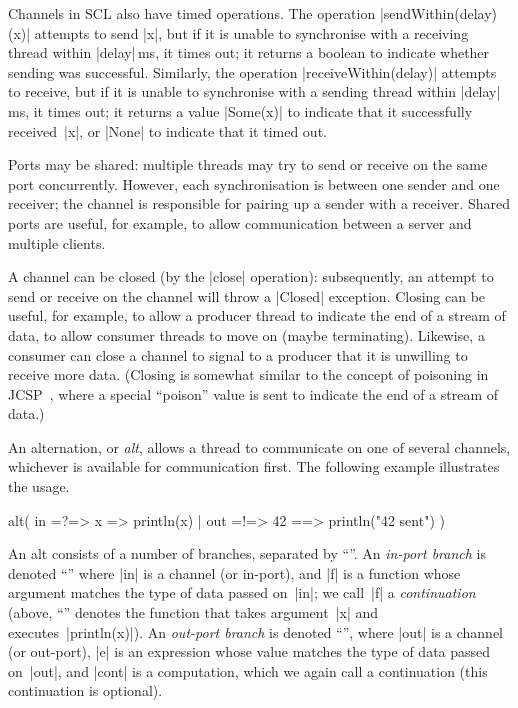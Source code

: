 Channels in SCL also have timed operations.  The operation
|sendWithin(delay)(x)| attempts to send |x|, but if it is unable to
synchronise with a receiving thread within |delay|\,ms, it times out; it
returns a boolean to indicate whether sending was successful.  Similarly, the
operation |receiveWithin(delay)| attempts to receive, but if it is unable to
synchronise with a sending thread within |delay|\,ms, it times out; it returns
a value |Some(x)| to indicate that it successfully received~|x|, or |None| to
indicate that it timed out.

Ports may be shared: multiple threads may try to send or receive on the same
port concurrently.  However, each synchronisation is between one sender and one
receiver; the channel is responsible for pairing up a sender with a receiver.
Shared ports are useful, for example, to allow communication between a server
and multiple clients.

A channel can be closed (by the |close| operation): subsequently, an attempt
to send or receive on the channel will throw a |Closed| exception.  Closing
can be useful, for example, to allow a producer thread to indicate the end of
a stream of data, to allow consumer threads to move on (maybe terminating).
Likewise, a consumer can close a channel to signal to a producer that it is
unwilling to receive more data.  (Closing is somewhat similar to the concept
of poisoning in JCSP~\cite{jcsp-poison}, where a special ``poison'' value is
sent to indicate the end of a stream of data.)   

An alternation, or \emph{alt}, allows a thread to communicate on one of
several channels, whichever is available for communication first.  The
following example illustrates the usage.
%
\begin{scala}
alt(
  in =?=> { x => println(x) }
  | out =!=> { 42 } ==> { println("42 sent") }
)
\end{scala}
%
An alt consists of a number of branches, separated by ``\SCALA{\|}''.  An
\emph{in-port branch} is denoted ``'' where |in| is a channel
(or in-port), and |f| is a function whose argument matches the type of data
passed on~|in|; we call~|f| a \emph{continuation} (above, ``'' denotes the function that takes argument~|x| and
executes~|println(x)|).  An \emph{out-port branch} is denoted ``'', where |out| is a channel (or out-port), |e| is an
expression whose value matches the type of data passed on~|out|, and |cont| is
a computation, which we again call a continuation (this continuation is
optional).

